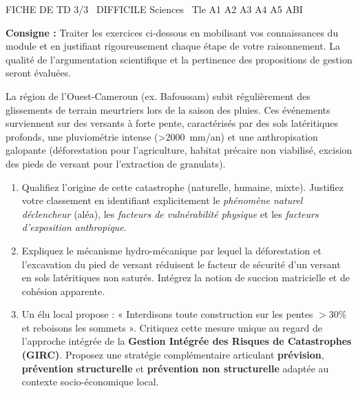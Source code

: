 \documentclass[11pt]{article}
\begin{document}
\begin{tcolorbox}[enhanced,colback=popink,colframe=popink,arc=10pt,boxrule=0pt,left=12pt,right=12pt,top=9pt,bottom=9pt]
{\color{white}\popxbold\small FICHE DE TD 3/3 \textbullet\ DIFFICILE \hfill Sciences \textbullet\ Tle A1 A2 A3 A4 A5 ABI\par}
\end{tcolorbox}
\vspace{4pt}
\noindent \textbf{Consigne :} Traiter les exercices ci-dessous en mobilisant vos connaissances du module et en justifiant rigoureusement chaque étape de votre raisonnement. La qualité de l'argumentation scientifique et la pertinence des propositions de gestion seront évaluées.

\begin{exercice}
    La région de l'Ouest-Cameroun (ex. Bafoussam) subit régulièrement des glissements de terrain meurtriers lors de la saison des pluies. Ces événements surviennent sur des versants à forte pente, caractérisés par des sols latéritiques profonds, une pluviométrie intense (\SI{>2000}{mm/an}) et une anthropisation galopante (déforestation pour l'agriculture, habitat précaire non viabilisé, excision des pieds de versant pour l'extraction de granulats).
    \begin{enumerate}
        \item Qualifiez l'origine de cette catastrophe (naturelle, humaine, mixte). Justifiez votre classement en identifiant explicitement le \textit{phénomène naturel déclencheur} (aléa), les \textit{facteurs de vulnérabilité physique} et les \textit{facteurs d'exposition anthropique}.
        \item Expliquez le mécanisme hydro-mécanique par lequel la déforestation et l'excavation du pied de versant réduisent le facteur de sécurité d'un versant en sols latéritiques non saturés. Intégrez la notion de succion matricielle et de cohésion apparente.
        \item Un élu local propose : « Interdisons toute construction sur les pentes $> 30\%$ et reboisons les sommets ». Critiquez cette mesure unique au regard de l'approche intégrée de la \textbf{Gestion Intégrée des Risques de Catastrophes (GIRC)}. Proposez une stratégie complémentaire articulant \textbf{prévision}, \textbf{prévention structurelle} et \textbf{prévention non structurelle} adaptée au contexte socio-économique local.
    \end{enumerate}
\end{exercice}
\end{document}
